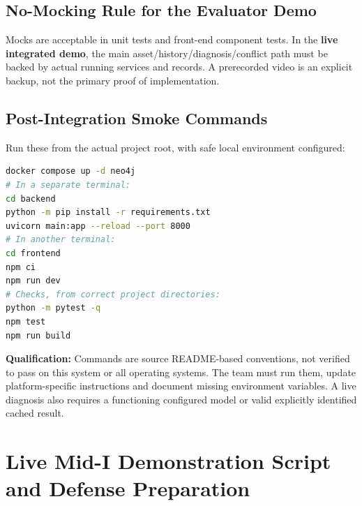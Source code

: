 \documentclass[11pt,a4paper,oneside]{report}
\begin{document}
\section{No-Mocking Rule for the Evaluator Demo}
Mocks are acceptable in unit tests and front-end component tests. In the \textbf{live integrated demo}, the main asset/history/diagnosis/conflict path must be backed by actual running services and records. A prerecorded video is an explicit backup, not the primary proof of implementation.

\section{Post-Integration Smoke Commands}
Run these from the actual project root, with safe local environment configured:
\begin{lstlisting}[language=bash]
docker compose up -d neo4j
# In a separate terminal:
cd backend
python -m pip install -r requirements.txt
uvicorn main:app --reload --port 8000
# In another terminal:
cd frontend
npm ci
npm run dev
# Checks, from correct project directories:
python -m pytest -q
npm test
npm run build
\end{lstlisting}
\textbf{Qualification:} Commands are source README-based conventions, not verified to pass on this system or all operating systems. The team must run them, update platform-specific instructions and document missing environment variables. A live diagnosis also requires a functioning configured model or valid explicitly identified cached result.

\chapter{Live Mid-I Demonstration Script and Defense Preparation}
\end{document}
